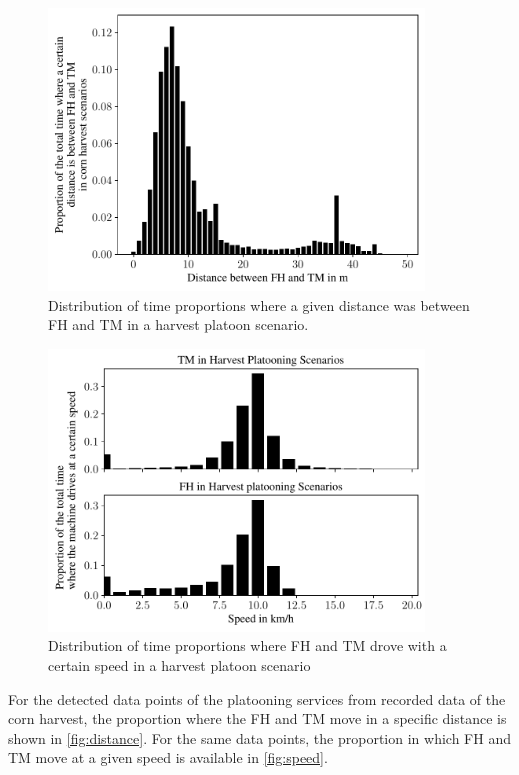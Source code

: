 \begin{figure}%
   \centering
   \includegraphics[width=0.89\textwidth]{figures/distanceHarvestScenario}
   \caption{Distribution of time proportions where a given distance was between \acf{FH} and \acf{TM} in a harvest platoon scenario.}%
   \label{fig:distance}%
\end{figure}
\begin{figure}%
   \centering
   \includegraphics[width=0.89\textwidth]{figures/speedHarvestScenario}
   \caption{Distribution of time proportions where \acf{FH} and \acf{TM} drove with a certain speed in a harvest platoon scenario}%
   \label{fig:speed}%
\end{figure}
For the detected data points of the platooning services from recorded data of the corn harvest,
the proportion where the \ac{FH} and \ac{TM} move in a specific distance is shown in \autoref{fig:distance}.
For the same data points, the proportion in which \ac{FH} and \ac{TM} move at a given speed is available in \autoref{fig:speed}.

